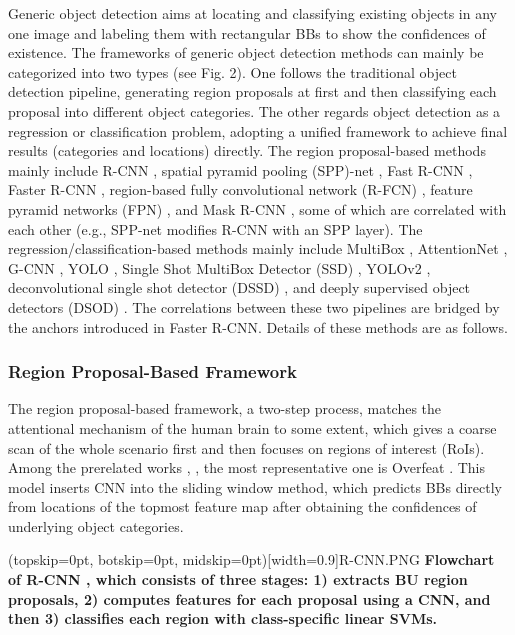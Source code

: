 \documentclass[two column]{ieeeaccess}
\begin{document}
Generic object detection aims at locating and classifying existing objects in any one image and labeling them with rectangular BBs to show the confidences of existence. The frameworks of generic object detection methods can mainly be categorized into two types (see Fig. 2). One follows the traditional object detection pipeline, generating region proposals at first and then classifying each proposal into different object categories. The other regards object detection as a regression or classification problem, adopting a unified framework to achieve final results (categories and locations) directly. The region proposal-based methods mainly include R-CNN \cite{15}, spatial pyramid pooling (SPP)-net \cite{64}, Fast R-CNN \cite{16}, Faster R-CNN \cite{17}, region-based fully convolutional network (R-FCN) \cite{65}, feature pyramid networks (FPN) \cite{66}, and Mask R-CNN \cite{67}, some of which are correlated with each other (e.g., SPP-net modifies R-CNN with an SPP layer). The regression/classification-based methods mainly include MultiBox \cite{68}, AttentionNet \cite{69}, G-CNN \cite{70}, YOLO \cite{18}, Single Shot MultiBox Detector (SSD) \cite{71}, YOLOv2 \cite{72}, deconvolutional single shot detector (DSSD) \cite{73}, and deeply supervised object detectors (DSOD) \cite{74}. The correlations between these two pipelines are bridged by the anchors introduced in Faster R-CNN. Details of these methods are as follows.


\subsubsection{Region Proposal-Based Framework}

The region proposal-based framework, a two-step process, matches the attentional mechanism of the human brain to some extent, which gives a coarse scan of the whole scenario first and then focuses on regions of interest (RoIs). Among the prerelated works \cite{44}, \cite{75,76}, the most representative one is Overfeat \cite{44}. This model inserts CNN into the sliding window method, which predicts BBs directly from locations of the topmost feature map after obtaining the confidences of underlying object categories.

\Figure[ht](topskip=0pt, botskip=0pt, midskip=0pt)[width=0.9\linewidth]{R-CNN.PNG} {\textbf{Flowchart of R-CNN \cite{15}, which consists of three stages: 1) extracts BU region proposals, 2) computes features for each proposal using a CNN, and then 3) classifies each region with class-specific linear SVMs.}\label{fig3}}
\end{document}
